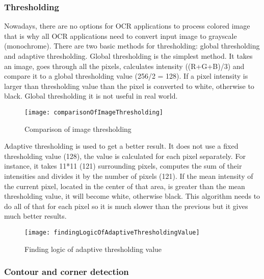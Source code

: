 \documentclass[../../main]{subfiles}
\begin{document}
\subsubsection{Thresholding}
Nowadays, there are no options for OCR applications to process colored image that is why all OCR applications need to convert input image to grayscale (monochrome). There are two basic methods for thresholding: global thresholding and adaptive thresholding. Global thresholding is the simplest method. It takes an image, goes through all the pixels, calculates intensity ((R+G+B)/3) and compare it to a global thresholding value (256/2 = 128). If a pixel intensity is larger than thresholding value than the pixel is converted to white, otherwise to black. Global thresholding it is not useful in real world.

\begin{figure} [ht]
\begin{center}
\texttt{[image: comparisonOfImageThresholding]}
\caption{Comparison of image thresholding}
\label{fig:comparisonOfImageThresholding}
\end{center}
\end{figure}

Adaptive thresholding is used to get a better result. It does not use a fixed thresholding value (128), the value is calculated for each pixel separately. For instance, it takes 11*11 (121) surrounding pixels, computes the sum of their intensities and divides it by the number of pixels (121). If the mean intensity of the current pixel, located in the center of that area, is greater than the mean thresholding value, it will become white, otherwise black. This algorithm needs to do all of that for each pixel so it is much slower than the previous but it gives much better results.

\begin{figure} [ht]
\begin{center}
\texttt{[image: findingLogicOfAdaptiveThresholdingValue]}
\caption{Finding logic of adaptive thresholding value}
\label{fig:findingLogicOfAdaptiveThresholdingValue}
\end{center}
\end{figure}

\subsubsection{Contour and corner detection}
\end{document}
